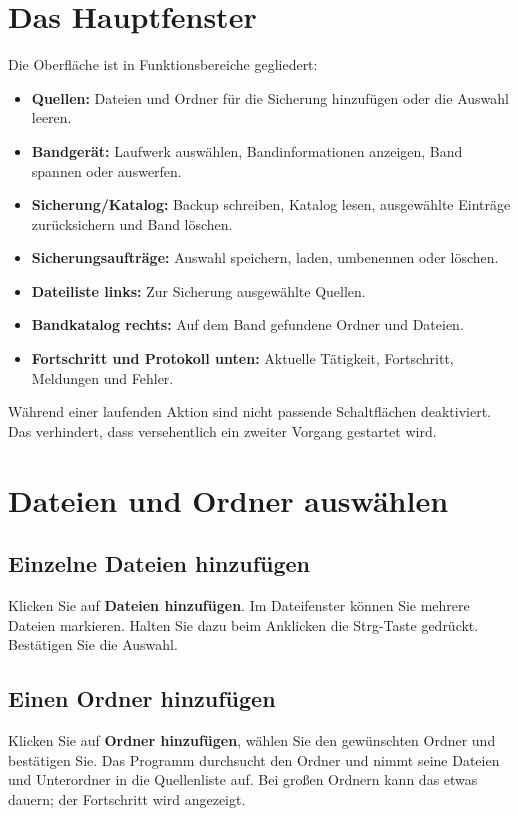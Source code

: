 \documentclass[11pt,a4paper]{article}
\begin{document}
\section{Das Hauptfenster}
Die Oberfläche ist in Funktionsbereiche gegliedert:
\begin{itemize}
\item \textbf{Quellen:} Dateien und Ordner für die Sicherung hinzufügen oder die Auswahl leeren.
\item \textbf{Bandgerät:} Laufwerk auswählen, Bandinformationen anzeigen, Band spannen oder auswerfen.
\item \textbf{Sicherung/Katalog:} Backup schreiben, Katalog lesen, ausgewählte Einträge zurücksichern und Band löschen.
\item \textbf{Sicherungsaufträge:} Auswahl speichern, laden, umbenennen oder löschen.
\item \textbf{Dateiliste links:} Zur Sicherung ausgewählte Quellen.
\item \textbf{Bandkatalog rechts:} Auf dem Band gefundene Ordner und Dateien.
\item \textbf{Fortschritt und Protokoll unten:} Aktuelle Tätigkeit, Fortschritt, Meldungen und Fehler.
\end{itemize}
Während einer laufenden Aktion sind nicht passende Schaltflächen deaktiviert. Das verhindert, dass versehentlich ein zweiter Vorgang gestartet wird.

\section{Dateien und Ordner auswählen}
\subsection{Einzelne Dateien hinzufügen}
Klicken Sie auf \textbf{Dateien hinzufügen}. Im Dateifenster können Sie mehrere Dateien markieren. Halten Sie dazu beim Anklicken die Strg-Taste gedrückt. Bestätigen Sie die Auswahl.

\subsection{Einen Ordner hinzufügen}
Klicken Sie auf \textbf{Ordner hinzufügen}, wählen Sie den gewünschten Ordner und bestätigen Sie. Das Programm durchsucht den Ordner und nimmt seine Dateien und Unterordner in die Quellenliste auf. Bei großen Ordnern kann das etwas dauern; der Fortschritt wird angezeigt.
\end{document}
